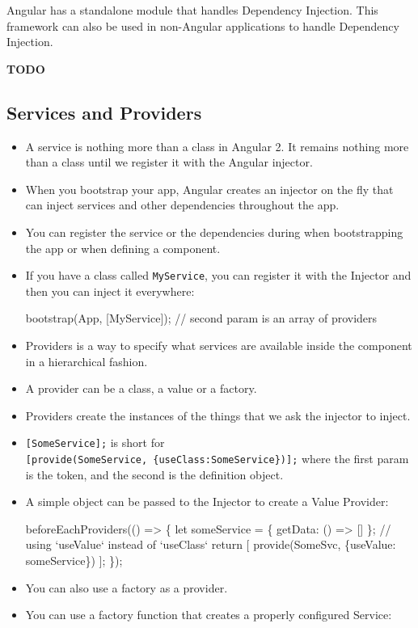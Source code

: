 \documentclass[12pt,]{article}
\newenvironment{Shaded}{}{}
\newcommand{\KeywordTok}[1]{\textcolor[rgb]{0.00,0.00,1.00}{{#1}}}
\newcommand{\CommentTok}[1]{\textcolor[rgb]{0.00,0.50,0.00}{{#1}}}
\newcommand{\FunctionTok}[1]{{#1}}
\newcommand{\NormalTok}[1]{{#1}}
\begin{document}
Angular has a standalone module that handles Dependency Injection. This
framework can also be used in non-Angular applications to handle
Dependency Injection.

\textbf{TODO}

\subsection{Services and Providers}\label{services-and-providers}

\begin{itemize}
\item
  A service is nothing more than a class in Angular 2. It remains
  nothing more than a class until we register it with the Angular
  injector.
\item
  When you bootstrap your app, Angular creates an injector on the fly
  that can inject services and other dependencies throughout the app.
\item
  You can register the service or the dependencies during when
  bootstrapping the app or when defining a component.
\item
  If you have a class called \texttt{MyService}, you can register it
  with the Injector and then you can inject it everywhere:

\begin{Shaded}
\begin{Highlighting}[numbers=left,,]
\FunctionTok{bootstrap}\NormalTok{(App, [MyService]); }\CommentTok{// second param is an array of providers}
\end{Highlighting}
\end{Shaded}
\item
  Providers is a way to specify what services are available inside the
  component in a hierarchical fashion.
\item
  A provider can be a class, a value or a factory.
\item
  Providers create the instances of the things that we ask the injector
  to inject.
\item
  \texttt{{[}SomeService{]};} is short for
  \texttt{{[}provide(SomeService,\ \{useClass:SomeService\}){]};} where
  the first param is the token, and the second is the definition object.
\item
  A simple object can be passed to the Injector to create a Value
  Provider:

\begin{Shaded}
\begin{Highlighting}[numbers=left,,]
\FunctionTok{beforeEachProviders}\NormalTok{(() => \{}
  \NormalTok{let someService = \{ getData: () => [] \};}
  \CommentTok{// using `useValue` instead of `useClass`}
  \KeywordTok{return} \NormalTok{[ }\FunctionTok{provide}\NormalTok{(SomeSvc, \{useValue: someService\}) ];}
\NormalTok{\});}
\end{Highlighting}
\end{Shaded}
\item
  You can also use a factory as a provider.
\item
  You can use a factory function that creates a properly configured
  Service:


\end{itemize}
\end{document}
